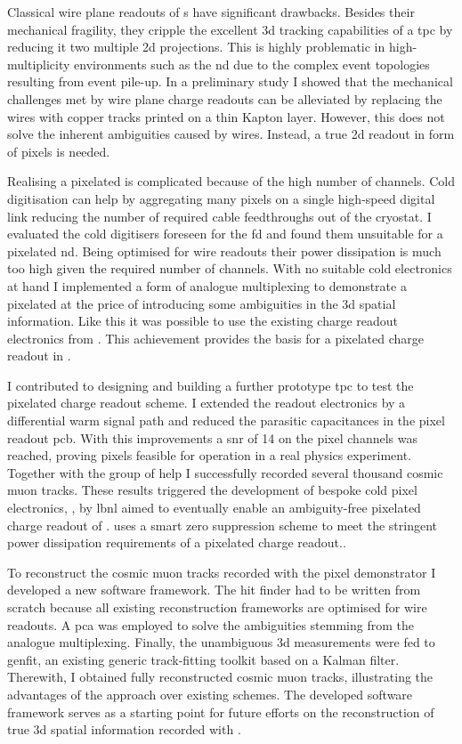 Classical wire plane readouts of \lartpc{}s have significant drawbacks.
Besides their mechanical fragility, they cripple the excellent \gls{3d} tracking capabilities of a \gls{tpc} by reducing it two multiple \gls{2d} projections.
This is highly problematic in high-multiplicity environments such as the \dune{} \gls{nd} due to the complex event topologies resulting from event pile-up.
In a preliminary study I showed that the mechanical challenges met by wire plane charge readouts can be alleviated by replacing the wires with copper tracks printed on a thin Kapton layer.
However, this does not solve the inherent ambiguities caused by wires.
Instead, a true \gls{2d} readout in form of pixels is needed.

Realising a pixelated \lartpc{} is complicated because of the high number of channels.
Cold digitisation can help by aggregating many pixels on a single high-speed digital link reducing the number of required cable feedthroughs out of the cryostat.
I evaluated the cold digitisers foreseen for the \dune{} \gls{fd} and found them unsuitable for a pixelated \gls{nd}.
Being optimised for wire readouts their power dissipation is much too high given the required number of channels.
With no suitable cold electronics at hand I implemented a form of analogue multiplexing to demonstrate a pixelated \lartpc{} at the price of introducing some ambiguities in the \gls{3d} spatial information.
Like this it was possible to use the existing charge readout electronics from \AT{}.
This achievement provides the basis for a pixelated charge readout in \AC{}.

I contributed to designing and building a further prototype \gls{tpc} to test the pixelated charge readout scheme.
I extended the \AT{} readout electronics by a differential warm signal path and reduced the parasitic capacitances in the pixel readout \gls{pcb}.
With this improvements a \gls{snr} of \num{14} on the pixel channels was reached, proving pixels feasible for operation in a real physics experiment.
Together with the \lar{} group of \gls{help} I successfully recorded several thousand cosmic muon tracks.
These results triggered the development of bespoke cold pixel electronics, \larpix{}, by \gls{lbnl} aimed to eventually enable an ambiguity-free pixelated charge readout of \AC{}.
\larpix{} uses a smart zero suppression scheme to meet the stringent power dissipation requirements of a pixelated charge readout..

To reconstruct the cosmic muon tracks recorded with the pixel demonstrator I developed a new software framework.
The hit finder had to be written from scratch because all existing \lartpc{} reconstruction frameworks are optimised for wire readouts.
A \gls{pca} was employed to solve the ambiguities stemming from the analogue multiplexing.
Finally, the unambiguous \gls{3d} measurements were fed to \gls{genfit}, an existing generic track-fitting toolkit based on a Kalman filter.
Therewith, I obtained fully reconstructed cosmic muon tracks, illustrating the advantages of the \AC{} approach over existing schemes.
The developed software framework serves as a starting point for future efforts on the reconstruction of true \gls{3d} spatial information recorded with \AC{}.

